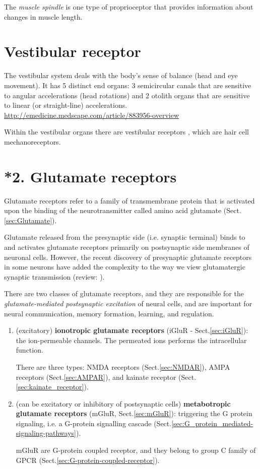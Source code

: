 The {\it muscle spindle} is one type of proprioceptor that provides information
about changes in muscle length.

\section{Vestibular receptor}
\label{sec:vestibular_receptor}

The vestibular system deals with the body's sense of balance (head and eye
movement). It has 5 distinct end organs: 3 semicircular canals that are
sensitive to angular accelerations (head rotations) and 2 otolith organs that are sensitive
to linear (or straight-line) accelerations.
\url{http://emedicine.medscape.com/article/883956-overview}

Within the vestibular organs there are vestibular receptors , which are hair
cell mechanoreceptors.

\section{*2. Glutamate receptors}
\label{sec:glutamate_receptor}

Glutamate receptors refer to a family of transmembrane protein that is activated
upon the binding of  the neurotransmitter called amino acid glutamate 
(Sect.\ref{sec:Glutamate}).

Glutamate released from the presynaptic side (i.e. synaptic terminal) binds to
and activates glutamate receptors primarily on postsynaptic side membranes of
neuronal cells. However, the recent discovery of presynaptic glutamate receptors
in some neurons have added the complexity to the way we view glutamatergic
synaptic transmission (review: \citep{pinheiro2008}).


There are two classes of glutamate receptors, and they are responsible for the
{\it glutamate-mediated postsynaptic excitation} of neural cells, and are
important for neural communication, memory formation, learning, and regulation.

\begin{enumerate}
  
  \item (excitatory) {\bf ionotropic glutamate receptors} (iGluR -
  Sect.\ref{sec:iGluR}): the ion-permeable channels. The permeated ions performs
  the intracellular function.
  
  There are three types: NMDA receptors (Sect.\ref{sec:NMDAR}), AMPA receptors
  (Sect.\ref{sec:AMPAR}), and kainate receptor
  (Sect.\ref{sec:kainate_receptor}).
  
  \item (can be excitatory or inhibitory of postsynaptic cells) {\bf
  metabotropic glutamate receptors} (mGluR, Sect.\ref{sec:mGluR}):
  triggering the G protein signaling, i.e. a G-protein signalling cascade
  (Sect.\ref{sec:G_protein_mediated-signaling-pathways}).
  
  mGluR are G-protein coupled receptor, and they belong to group C family of
  GPCR (Sect.\ref{sec:G-protein-coupled-receptor}).
  
\end{enumerate}


